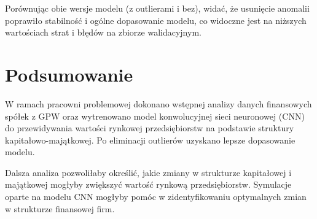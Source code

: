 \documentclass[12pt]{article}
\begin{document}
Porównując obie wersje modelu (z outlierami i bez), widać, że usunięcie anomalii poprawiło stabilność i ogólne dopasowanie modelu, co widoczne jest na niższych wartościach strat i błędów na zbiorze walidacyjnym.

\newpage \section{Podsumowanie}

W ramach pracowni problemowej dokonano wstępnej analizy danych finansowych spółek z GPW oraz wytrenowano model konwolucyjnej sieci neuronowej (CNN) do przewidywania wartości rynkowej przedsiębiorstw na podstawie struktury kapitałowo-majątkowej. Po eliminacji outlierów uzyskano lepsze dopasowanie modelu.

Dalsza analiza pozwoliłaby określić, jakie zmiany w strukturze kapitałowej i majątkowej mogłyby zwiększyć wartość rynkową przedsiębiorstw. Symulacje oparte na modelu CNN mogłyby pomóc w zidentyfikowaniu optymalnych zmian w strukturze finansowej firm.
\end{document}
